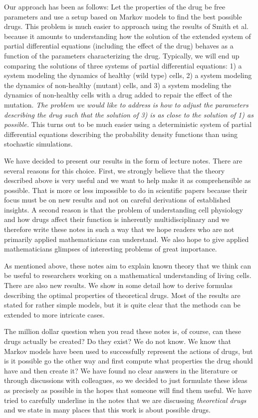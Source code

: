 \bigskip

Our approach has been as follows: Let the properties of the drug be free parameters and use a setup based on Markov models to find the best possible drugs. This problem is much easier to approach using the results of Smith et al. because it amounts to understanding how the solution of the extended system of partial differential equations (including the effect of the drug)  behaves as a function of the parameters characterizing the drug. Typically, we will end up comparing the solutions of three systems of partial differential equations: 1) a system modeling the dynamics of healthy (wild type) cells, 2) a system modeling the dynamics of non-healthy (mutant) cells, and 3) a system modeling the dynamics of non-healthy cells with a drug added to repair the effect of the mutation. {\it The problem we would like to address is how to adjust the parameters describing the drug such that the solution of 3) is as close to the solution of 1) as possible.} This turns out to be much easier using a deterministic system of partial differential equations describing the probability density functions than using stochastic simulations.

\bigskip

 We have decided to present our results in the form of lecture notes. There are several reasons for this choice. First, we strongly believe that the theory described above is very useful and we want to help make it as comprehensible as possible. That is more or less impossible to do in scientific papers because their focus must be on new results and not on careful derivations of established insights. A second reason is that the problem of understanding cell physiology and how drugs affect their function is inherently multidisciplinary and we therefore write these notes in such a way that we hope readers who are not primarily applied mathematicians can understand.  We also hope to give applied mathematicians glimpses of interesting problems of great importance.
\bigskip

As mentioned above, these notes aim to explain known theory that we think can be useful to researchers working on a mathematical understanding of living cells.  There are also new results. We show in some detail how to derive formulas describing the optimal properties of theoretical drugs. Most of the results are stated for rather simple models, but it is quite clear that the methods can be extended to more intricate cases.
\bigskip

The million dollar question when you read these notes is, of course, can these drugs actually be created? Do they exist? We do not know. We know that Markov models have been used to successfully represent the actions of drugs, but is it possible go the other way and first compute what properties the drug should have and then create it?  We have found no clear answers in the literature or through discussions with colleagues, so we decided to just formulate these ideas as precisely as possible in the hopes that someone will find them useful. We have tried to carefully underline in the notes that we are discussing {\it theoretical drugs} and we state in many places that this work is about possible drugs.

